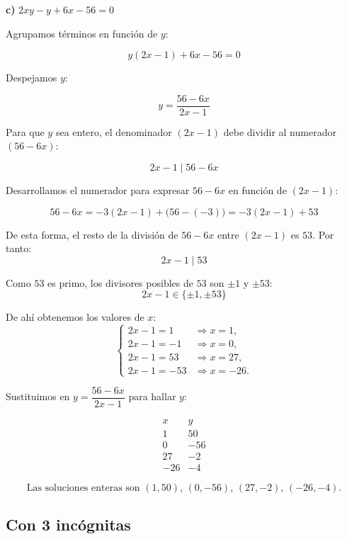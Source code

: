 \documentclass[a4paper,12pt]{article}
\begin{document}
\begin{ejercicio}[title=Ejercicio 19]
\textbf{c) } $2xy - y + 6x - 56 = 0$

\vspace{0.3em}
Agrupamos términos en función de $y$:

\[
y(2x - 1) + 6x - 56 = 0
\]

Despejamos $y$:

\[
y = \frac{56 - 6x}{2x - 1}
\]

Para que $y$ sea entero, el denominador $(2x - 1)$ debe dividir al numerador $(56 - 6x)$:

\[
2x - 1 \mid 56 - 6x
\]

Desarrollamos el numerador para expresar $56 - 6x$ en función de $(2x - 1)$:

\[
56 - 6x = -3(2x - 1) + \big(56 - (-3)\big) = -3(2x - 1) + 53
\]

De esta forma, el resto de la división de $56 - 6x$ entre $(2x - 1)$ es $53$.  
Por tanto:
\[
2x - 1 \mid 53
\]

Como $53$ es primo, los divisores posibles de $53$ son $\pm1$ y $\pm53$:
\[
2x - 1 \in \{\pm1, \pm53\}
\]

De ahí obtenemos los valores de $x$:
\[
\begin{cases}
2x - 1 = 1 &\Rightarrow x = 1,\\[0.3em]
2x - 1 = -1 &\Rightarrow x = 0,\\[0.3em]
2x - 1 = 53 &\Rightarrow x = 27,\\[0.3em]
2x - 1 = -53 &\Rightarrow x = -26.
\end{cases}
\]

Sustituimos en $y = \dfrac{56 - 6x}{2x - 1}$ para hallar $y$:

\[
\begin{array}{c|c}
x & y \\
\hline
1 & 50\\
0 & -56\\
27 & -2\\
-26 & -4
\end{array}
\]

\vspace{0.5em}

\[
\boxed{\text{Las soluciones enteras son } (1,50),\, (0,-56),\, (27,-2),\, (-26,-4).}
\]
\end{ejercicio}

\subsection{Con 3 incógnitas}
\end{document}
